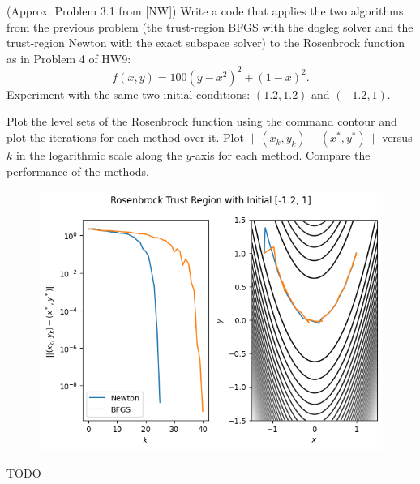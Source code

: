 \documentclass{../kin_math}
\begin{document}
\begin{questions}
  \question (Approx. Problem 3.1 from [NW]) Write a code that applies the two algorithms from the previous problem (the trust-region BFGS with the dogleg solver and the trust-region Newton with the exact subspace solver) to the Rosenbrock function as in Problem 4 of HW9:
  \begin{equation}
    f(x, y) = 100(y - x^2)^2 + (1 - x)^2.
  \end{equation}
  Experiment with the same two initial conditions: $(1.2, 1.2)$ and $(-1.2, 1)$.

  Plot the level sets of the Rosenbrock function using the command contour and plot the iterations for each method over it. Plot $\lVert (x_k, y_k) - (x^*, y^*) \rVert$ versus $k$ in the logarithmic scale along the $y$-axis for each method. Compare the performance of the methods.
  \begin{solution}
    \begin{figure}
      \centering
      \includegraphics[scale=0.6]{rosenbrock.png}
    \end{figure}
    TODO
  \end{solution}
\end{questions}
\end{document}
